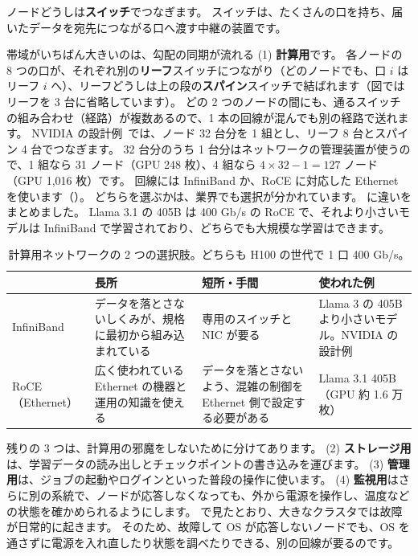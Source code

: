 ノードどうしは\textbf{スイッチ}でつなぎます。
スイッチは、たくさんの口を持ち、届いたデータを宛先につながる口へ渡す中継の装置です。

帯域がいちばん大きいのは、勾配の同期が流れる (1) \textbf{計算用}です。
各ノードの 8 つの口が、それぞれ別の\textbf{リーフ}スイッチにつながり（どのノードでも、口 $i$ はリーフ $i$ へ）、リーフどうしは上の段の\textbf{スパイン}スイッチで結ばれます（図ではリーフを 3 台に省略しています）。
どの 2 つのノードの間にも、通るスイッチの組み合わせ（経路）が複数あるので、1 本の回線が混んでも別の経路で送れます。
NVIDIA の設計例~\cite{nvidia2023superpod}では、ノード 32 台分を 1 組とし、リーフ 8 台とスパイン 4 台でつなぎます。
32 台分のうち 1 台分はネットワークの管理装置が使うので、1 組なら 31 ノード（GPU 248 枚）、4 組なら $4\times32-1=127$ ノード（GPU 1,016 枚）です。
回線には InfiniBand か、RoCE に対応した Ethernet を使います（）。
どちらを選ぶかは、業界でも選択が分かれています。
に違いをまとめました。
Llama 3.1 の 405B は 400 Gb/s の RoCE で、それより小さいモデルは InfiniBand で学習されており\cite{dubey2024llama3}、どちらでも大規模な学習はできます。

\begin{table}[tbp]
\centering
\caption{計算用ネットワークの 2 つの選択肢。どちらも H100 の世代で 1 口 400 Gb/s。}
\label{tab:infra-ibroce}
\footnotesize
\begin{tabular}{>{\raggedright\arraybackslash}p{16mm}>{\raggedright\arraybackslash}p{30mm}>{\raggedright\arraybackslash}p{34mm}>{\raggedright\arraybackslash}p{29mm}}
\toprule
 & 長所 & 短所・手間 & 使われた例 \\
\midrule
InfiniBand & データを落とさないしくみが、規格に最初から組み込まれている & 専用のスイッチと NIC が要る & Llama 3 の 405B より小さいモデル。NVIDIA の設計例~\cite{nvidia2023superpod} \\
\addlinespace[2pt]
RoCE（Ethernet） & 広く使われている Ethernet の機器と運用の知識を使える & データを落とさないよう、混雑の制御を Ethernet 側で設定する必要がある & Llama 3.1 405B（GPU 約 1.6 万枚） \\
\bottomrule
\end{tabular}
\end{table}

残りの 3 つは、計算用の邪魔をしないために分けてあります。
(2) \textbf{ストレージ用}は、学習データの読み出しとチェックポイントの書き込みを運びます。
(3) \textbf{管理用}は、ジョブの起動やログインといった普段の操作に使います。
(4) \textbf{監視用}はさらに別の系統で、ノードが応答しなくなっても、外から電源を操作し、温度などの状態を確かめられるようにします。
で見たとおり、大きなクラスタでは故障が日常的に起きます。
そのため、故障して OS が応答しないノードでも、OS を通さずに電源を入れ直したり状態を調べたりできる、別の回線が要るのです。


